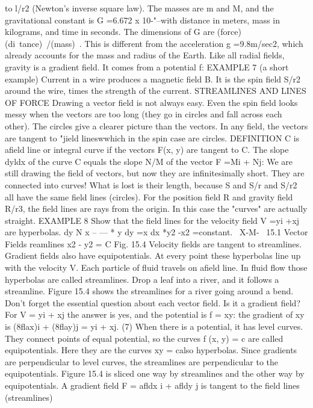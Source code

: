 to l/r2 (Newton's inverse square law). The masses are m and M, and the
gravitational constant is G =6.672 x 10-"--with distance in meters, mass in kilograms,
and time in seconds. The dimensions of G are (force)(di~tance)~/(mass)~. This
is different from the acceleration g =9.8m/sec2, which already accounts for the mass
and radius of the Earth.
Like all radial fields, gravity is a gradient field. It comes from a potential f:
EXAMPLE 7 (a short example) Current in a wire produces a magnetic field B. It is
the spin field S/r2 around the wire, times the strength of the current.
STREAMLINES AND LINES OF FORCE
Drawing a vector field is not always easy. Even the spin field looks messy when the
vectors are too long (they go in circles and fall across each other). The circles give a
clearer picture than the vectors. In any field, the vectors are tangent to "jield lineswwhich
in the spin case are circles.
DEFINITION C is afield line or integral curve if the vectors F(x, y) are tangent to C.
The slope dyldx of the curve C equals the slope N/M of the vector F =Mi + Nj:
We are still drawing the field of vectors, but now they are infinitesimally short.
They are connected into curves! What is lost is their length, because S and S/r and
S/r2 all have the same field lines (circles). For the position field R and gravity field
R/r3, the field lines are rays from the origin. In this case the "curves" are actually
straight.
EXAMPLE 8 Show that the field lines for the velocity field V =yi +xj are hyperbolas.
dy N x -- --- * y dy =x dx *y2 -x2 =constant.
~X-M-~ 
15.1 Vector Fields
reamlines x2 - y2 = C
Fig. 15.4 Velocity fields are tangent to streamlines. Gradient fields also have equipotentials.
At every point these hyperbolas line up with the velocity V. Each particle of fluid
travels on afield line. In fluid flow those hyperbolas are called streamlines. Drop a
leaf into a river, and it follows a streamline. Figure 15.4 shows the streamlines for a
river going around a bend.
Don't forget the essential question about each vector field. Is it a gradient field?
For V = yi + xj the answer is yes, and the potential is f = xy:
the gradient of xy is (8flax)i + (8flay)j = yi + xj. (7)
When there is a potential, it has level curves. They connect points of equal potential,
so the curves f (x, y) = c are called equipotentials. Here they are the curves xy = calso
hyperbolas. Since gradients are perpendicular to level curves, the streamlines are
perpendicular to the equipotentials. Figure 15.4 is sliced one way by streamlines and
the other way by equipotentials.
A gradient field F = afldx i + afldy j is tangent to the field lines (streamlines)

